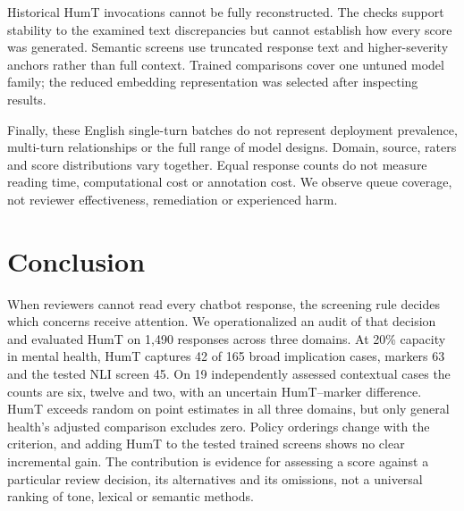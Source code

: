 Historical HumT invocations cannot be fully reconstructed. The checks support stability to the examined text discrepancies but cannot establish how every score was generated. Semantic screens use truncated response text and higher-severity anchors rather than full context. Trained comparisons cover one untuned model family; the reduced embedding representation was selected after inspecting results.

Finally, these English single-turn batches do not represent deployment prevalence, multi-turn relationships or the full range of model designs. Domain, source, raters and score distributions vary together. Equal response counts do not measure reading time, computational cost or annotation cost. We observe queue coverage, not reviewer effectiveness, remediation or experienced harm.

\section{Conclusion}
When reviewers cannot read every chatbot response, the screening rule decides which concerns receive attention. We operationalized an audit of that decision and evaluated HumT on 1,490 responses across three domains. At 20\% capacity in mental health, HumT captures 42 of 165 broad implication cases, markers 63 and the tested NLI screen 45. On 19 independently assessed contextual cases the counts are six, twelve and two, with an uncertain HumT--marker difference. HumT exceeds random on point estimates in all three domains, but only general health's adjusted comparison excludes zero. Policy orderings change with the criterion, and adding HumT to the tested trained screens shows no clear incremental gain. The contribution is evidence for assessing a score against a particular review decision, its alternatives and its omissions, not a universal ranking of tone, lexical or semantic methods.
